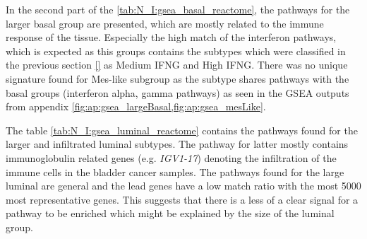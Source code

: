In the second part of the \cref{tab:N_I:gsea_basal_reactome}, the pathways for the larger basal group are presented, which are mostly related to the immune response of the tissue. Especially the high match of the interferon pathways, which is expected as this groups contains the subtypes which were classified in the previous section \ref{} as Medium IFNG and High IFNG. There was no unique signature found for Mes-like subgroup as the subtype shares pathways with the basal groups (interferon alpha, gamma pathways) as seen in the GSEA outputs from appendix \cref{fig:ap:gsea_largeBasal,fig:ap:gsea_mesLike}.

The table \cref{tab:N_I:gsea_luminal_reactome} contains the pathways found for the larger and infiltrated luminal subtypes. The pathway for latter mostly contains immunoglobulin related genes (e.g. \textit{IGV1-17}) denoting the infiltration of the immune cells in the bladder cancer samples. The pathways found for the large luminal are general and the lead genes have a low match ratio with the most 5000 most representative genes. This suggests that there is a less of a clear signal for a pathway to be enriched which might be explained by the size of the luminal group. 

